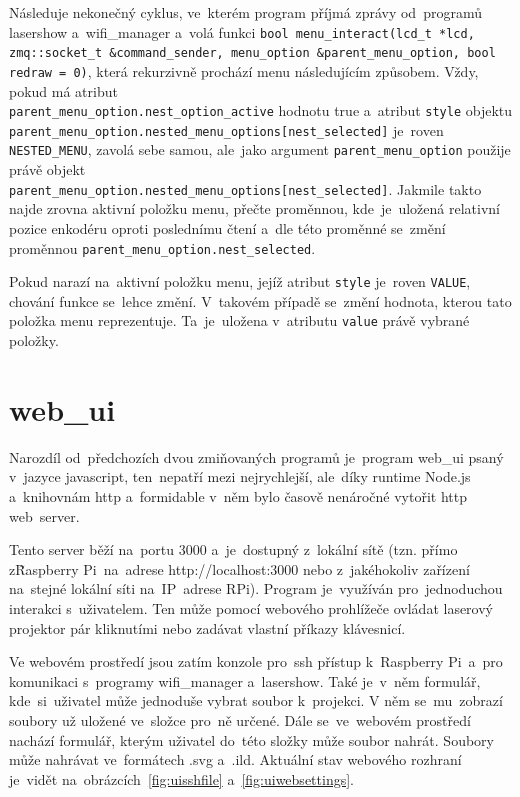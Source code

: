         Následuje nekonečný cyklus, ve~kterém program příjmá zprávy od~programů lasershow a~wifi\_manager a~volá funkci \texttt{bool menu_interact(lcd_t *lcd, zmq::socket_t &command_sender, menu_option &parent_menu_option, bool redraw = 0)}, která rekurzivně prochází menu následujícím způsobem.
Vždy, pokud má atribut \\
\texttt{parent_menu_option.nest_option_active} hodnotu true a~atribut \texttt{style} objektu \texttt{parent_menu_option.nested_menu_options[nest_selected]} je~roven \texttt{NESTED_MENU}, zavolá sebe samou, ale~jako argument \texttt{parent_menu_option} použije právě objekt \\
\texttt{parent_menu_option.nested_menu_options[nest_selected]}.
Jakmile takto najde zrovna aktivní položku menu, přečte proměnnou, kde~je~uložená relativní pozice enkodéru oproti poslednímu čtení a~dle této proměnné se~změní proměnnou \texttt{parent_menu_option.nest_selected}.

Pokud narazí na~aktivní položku menu, jejíž atribut \texttt{style} je~roven \texttt{VALUE}, chování funkce se~lehce změní. V~takovém případě se~změní hodnota, kterou tato položka menu reprezentuje. Ta~je~uložena v~atributu \texttt{value} právě vybrané položky.

\section{web\_ui}

Narozdíl od~předchozích dvou zmiňovaných programů je~program web\_ui psaný v~jazyce javascript, ten~nepatří mezi nejrychlejší, ale~díky runtime Node.js a~knihovnám http a~formidable v~něm bylo časově nenáročné vytořit http web~server.

Tento server běží na~portu 3000 a~je~dostupný z~lokální sítě (tzn. přímo z\~Raspberry Pi~na~adrese http://localhost:3000 nebo z~jakéhokoliv zařízení na~stejné lokální síti na~IP~adrese RPi).
Program je~využíván pro~jednoduchou interakci s~uživatelem.
Ten může pomocí webového prohlížeče ovládat laserový projektor pár kliknutími nebo zadávat vlastní příkazy klávesnicí.

Ve webovém prostředí jsou zatím konzole pro~ssh přístup k~Raspberry Pi~a~pro komunikaci s~programy wifi\_manager a~lasershow.
Také je~v~něm formulář, kde~si~uživatel může jednoduše vybrat soubor k~projekci.
V něm se~mu~zobrazí soubory už uložené ve~složce pro~ně určené. Dále se~ve~webovém prostředí nachází formulář, kterým uživatel do~této složky může soubor nahrát. Soubory může nahrávat ve~formátech .svg a~.ild.
Aktuální stav webového rozhraní je~vidět na~obrázcích~\ref{fig:uisshfile} a~\ref{fig:uiwebsettings}.

